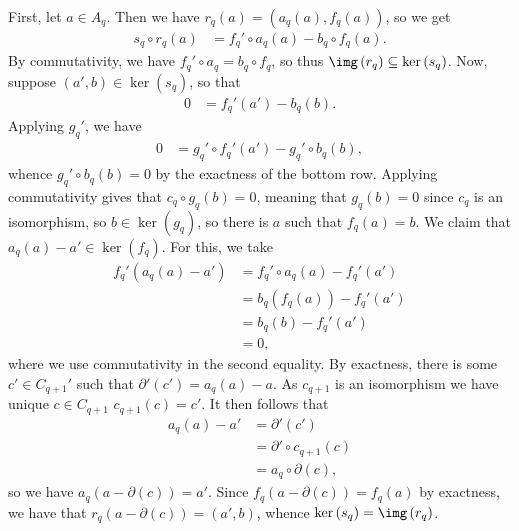 \documentclass[10pt]{mypackage}
\begin{document}
\begin{solution}
  First, let $a\in A_q$. Then we have $r_q(a) = \left( a_q(a),f_q(a) \right)$, so we get
  \begin{align*}
    s_q\circ r_q(a) &= f_q'\circ a_q(a) - b_q\circ f_q(a).
  \end{align*}
  By commutativity, we have $f_q'\circ a_q = b_q\circ f_q$, so thus $\img\left( r_q \right)\subseteq \ker\left( s_q \right)$. Now, suppose $\left( a',b \right)\in \ker\left( s_q \right)$, so that
  \begin{align*}
    0 &= f_q'\left( a' \right) - b_q(b).
  \end{align*}
  Applying $g_q'$, we have
  \begin{align*}
    0 &= g_q'\circ f_q'\left( a' \right) - g_q'\circ b_q(b),
  \end{align*}
  whence $g_q'\circ b_q(b) = 0$ by the exactness of the bottom row. Applying commutativity gives that $c_q\circ g_q(b) = 0$, meaning that $g_q(b) = 0$ since $c_q$ is an isomorphism, so $b\in \ker\left( g_q \right)$, so there is $a$ such that $f_q(a) = b$. We claim that $a_q(a) - a'\in \ker\left( f_q \right)$. For this, we take
  \begin{align*}
    f_q'\left( a_q(a) - a' \right) &= f_q'\circ a_q(a) - f_q'\left( a' \right)\\
                                   &= b_q\left( f_q(a) \right) - f_q'\left( a' \right)\\
                                   &= b_q\left( b \right) - f_q'\left( a' \right)\\
                                   &= 0,
  \end{align*}
  where we use commutativity in the second equality. By exactness, there is some $c'\in C_{q+1}'$ such that $\partial'\left( c' \right) = a_q(a) - a$. As $c_{q+1}$ is an isomorphism we have unique $c\in C_{q+1}$ $c_{q+1}\left( c \right) = c'$. It then follows that
  \begin{align*}
    a_q(a) - a' &= \partial'\left( c' \right)\\
                &= \partial'\circ c_{q+1}\left( c \right)\\
                &= a_{q}\circ \partial\left( c \right),
  \end{align*}
  so we have $a_q\left( a-\partial(c) \right) = a'$. Since $f_q\left( a-\partial(c) \right) = f_q(a)$ by exactness, we have that $r_q\left( a-\partial(c) \right) = \left( a',b \right)$, whence $\ker\left( s_q \right) = \img\left( r_q \right)$.


\end{solution}
\end{document}
